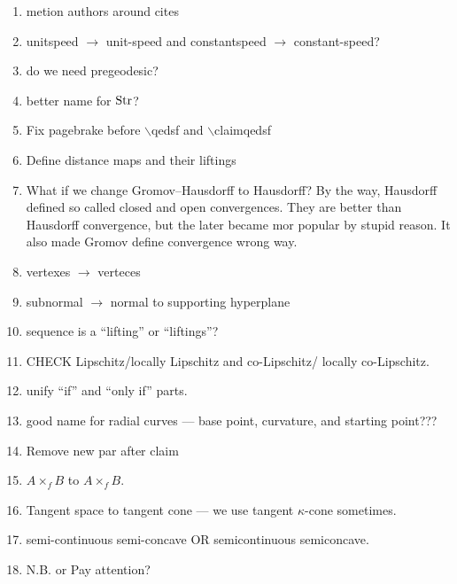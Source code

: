 \begin{enumerate}
\item metion authors around  cites 

\item unitspeed $\to$ unit-speed and constantspeed $\to$ constant-speed?

\item do we need pregeodesic?

\item better name for $\mathop{\rm Str}\nolimits$?

\item Fix pagebrake before $\backslash$qedsf and $\backslash$claimqedsf

\item Define distance maps and their liftings

\item What if we change Gromov--Hausdorff to Hausdorff?
By the way, Hausdorff defined so called closed and open convergences.
They are better than Hausdorff convergence, but the later became mor popular by stupid reason.
It also made Gromov define convergence wrong way.

\item vertexes $\to$ verteces

\item subnormal $\to$ normal to supporting hyperplane

\item sequence is a ``lifting'' or ``liftings''?

\item CHECK Lipschitz/locally Lipschitz and co-Lipschitz/ locally co-Lipschitz.

\item unify ``if'' and ``only if'' parts.

\item good name for radial curves --- base point, curvature, and starting point???

\item Remove new par after claim

\item $A\times_f B$ to $A\mathrel{{\times}_f} B$.

\item Tangent space to tangent cone --- we use tangent $\kappa$-cone sometimes.

\item semi-continuous semi-concave OR semicontinuous semiconcave.

\item N.B. or Pay attention?


\end{enumerate}
